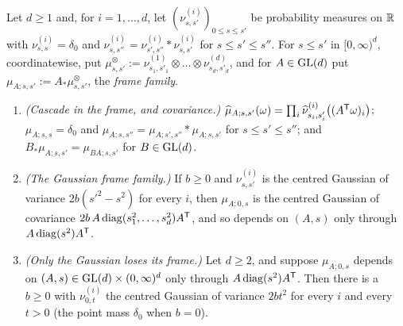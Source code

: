 \begin{proposition}
\label{prop:frame-families}
\leanok
Let $d \ge 1$ and, for $i = 1,\dots,d$, let $(\nu^{(i)}_{s,s'})_{0 \le s \le s'}$ be probability
measures on $\mathbb{R}$ with $\nu^{(i)}_{s,s} = \delta_0$ and
$\nu^{(i)}_{s,s''} = \nu^{(i)}_{s',s''} * \nu^{(i)}_{s,s'}$ for $s \le s' \le s''$. For
$s \le s'$ in $[0,\infty)^d$, coordinatewise, put
$\mu^{\otimes}_{s,s'} := \nu^{(1)}_{s_1,s'_1} \otimes \dots \otimes \nu^{(d)}_{s_d,s'_d}$, and for
$A \in \mathrm{GL}(d)$ put $\mu_{A;s,s'} := A_*\mu^{\otimes}_{s,s'}$, the \emph{frame family}.
\begin{enumerate}
\item \emph{(Cascade in the frame, and covariance.)}
$\widehat\mu_{A;s,s'}(\omega) = \prod_{i}\widehat\nu^{(i)}_{s_i,s'_i}\bigl((A^{\mathsf{T}}\omega)_i\bigr)$;
$\mu_{A;s,s} = \delta_0$ and $\mu_{A;s,s''} = \mu_{A;s',s''} * \mu_{A;s,s'}$ for
$s \le s' \le s''$; and $B_*\mu_{A;s,s'} = \mu_{BA;s,s'}$ for $B \in \mathrm{GL}(d)$.
\item \emph{(The Gaussian frame family.)} If $b \ge 0$ and $\nu^{(i)}_{s,s'}$ is the centred
Gaussian of variance $2b(s'^2 - s^2)$ for every $i$, then $\mu_{A;0,s}$ is the centred Gaussian of
covariance $2b\,A\operatorname{diag}(s_1^2,\dots,s_d^2)A^{\mathsf{T}}$, and so depends on $(A,s)$ only through
$A\operatorname{diag}(s^2)A^{\mathsf{T}}$.
\item \emph{(Only the Gaussian loses its frame.)} Let $d \ge 2$, and suppose $\mu_{A;0,s}$ depends
on $(A,s) \in \mathrm{GL}(d) \times (0,\infty)^d$ only through $A\operatorname{diag}(s^2)A^{\mathsf{T}}$. Then there is a
$b \ge 0$ with $\nu^{(i)}_{0,t}$ the centred Gaussian of variance $2bt^2$ for every $i$ and every
$t > 0$ (the point mass $\delta_0$ when $b = 0$).
\end{enumerate}

\end{proposition}
